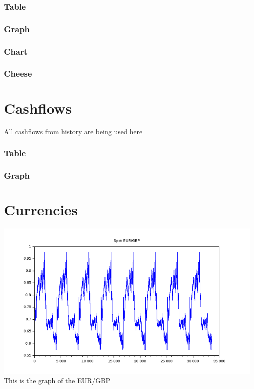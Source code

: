 \documentclass[8pt]{article} %
\begin{document}
\subsubsection{Table}

\subsubsection{Graph}

\subsubsection{Chart}
\subsubsection{Cheese}


\section{Cashflows}


All cashflows from history are being used here\\

\subsubsection{Table}

\subsubsection{Graph}
%

\section{Currencies}


\includegraphics[scale=0.6]{Scilab-currencies.png}
This is the graph of the EUR/GBP 
\end{document}
